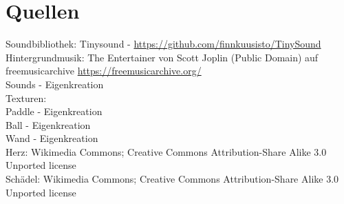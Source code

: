 \section{Quellen}
Soundbibliothek: Tinysound -  \url{https://github.com/finnkuusisto/TinySound}\\
Hintergrundmusik: The Entertainer von Scott Joplin (Public Domain) auf freemusicarchive  \url{https://freemusicarchive.org/}\\
Sounds - Eigenkreation \\
Texturen:\\
Paddle - Eigenkreation\\
Ball - Eigenkreation\\
Wand - Eigenkreation\\
Herz: Wikimedia Commons; Creative Commons Attribution-Share Alike 3.0 Unported license\\
Schädel: Wikimedia Commons; Creative Commons Attribution-Share Alike 3.0 Unported license\\